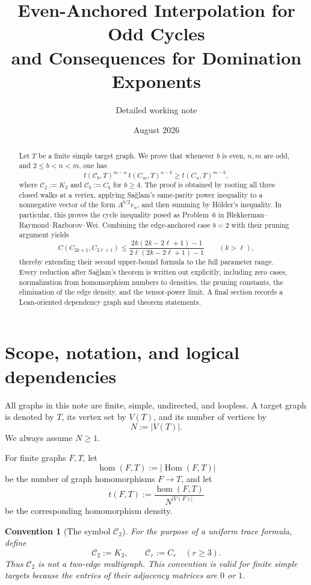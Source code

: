 \documentclass[11pt]{article}
\title{Even-Anchored Interpolation for Odd Cycles\\
       and Consequences for Domination Exponents}
\author{Detailed working note}
\date{August 2026}
\newtheorem{convention}[theorem]{Convention}
\newcommand{\Hom}{\operatorname{Hom}}
\newcommand{\homn}{\operatorname{hom}}
\newcommand{\1}{\mathbf{1}}
\newcommand{\Ct}{\mathcal{C}}
\begin{document}
\maketitle

\begin{abstract}
Let $T$ be a finite simple target graph.  We prove that whenever $b$ is even,
$n,m$ are odd, and $2\le b<n<m$, one has
\[
  t(\Ct_b,T)^{m-n}\,t(C_m,T)^{n-b}
  \ge t(C_n,T)^{m-b},
\]
where $\Ct_2:=K_2$ and $\Ct_b:=C_b$ for $b\ge4$.
The proof is obtained by rooting all three closed walks at a vertex, applying
Sa\u{g}lam's same-parity power inequality to a nonnegative vector of the form
$A^{b/2}e_x$, and then summing by H\"older's inequality.  In particular, this
proves the cycle inequality posed as Problem~6 in Blekherman--Raymond--Razborov--Wei.
Combining the edge-anchored case $b=2$ with their pruning argument yields
\[
 C(C_{2k+1},C_{2\ell+1})
 \le
 \frac{2k(2k-2\ell+1)-1}
      {2\ell(2k-2\ell+1)-1}
 \qquad (k>\ell),
\]
thereby extending their second upper-bound formula to the full parameter range.
Every reduction after Sa\u{g}lam's theorem is written out explicitly, including
zero cases, normalization from homomorphism numbers to densities, the pruning
constants, the elimination of the edge density, and the tensor-power limit.
A final section records a Lean-oriented dependency graph and theorem statements.
\end{abstract}

\tableofcontents

\section{Scope, notation, and logical dependencies}

All graphs in this note are finite, simple, undirected, and loopless.  A target
graph is denoted by $T$, its vertex set by $V(T)$, and its number of vertices by
\[
  N:=|V(T)|.
\]
We always assume $N\ge1$.

For finite graphs $F,T$, let
\[
  \homn(F,T):=|\Hom(F,T)|
\]
be the number of graph homomorphisms $F\to T$, and let
\[
  t(F,T):=\frac{\homn(F,T)}{N^{|V(F)|}}
\]
be the corresponding homomorphism density.

\begin{convention}[The symbol $\Ct_2$]
For the purpose of a uniform trace formula, define
\[
  \Ct_2:=K_2,
  \qquad
  \Ct_r:=C_r\quad(r\ge3).
\]
Thus $\Ct_2$ is not a two-edge multigraph.  This convention is valid for
finite simple targets because the entries of their adjacency matrices are
$0$ or $1$.
\end{convention}
\end{document}
